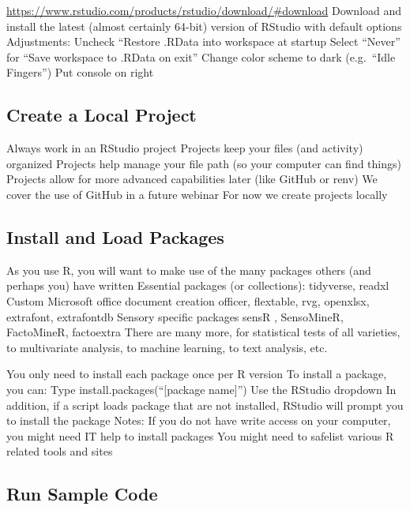 \documentclass[
]{book}
\begin{document}
\url{https://www.rstudio.com/products/rstudio/download/\#download}
Download and install the latest (almost certainly 64-bit) version of RStudio with default options
Adjustments:
Uncheck ``Restore .RData into workspace at startup
Select ``Never'' for ``Save workspace to .RData on exit''
Change color scheme to dark (e.g.~``Idle Fingers'')
Put console on right

\hypertarget{create-a-local-project}{%
\subsection{Create a Local Project}\label{create-a-local-project}}

Always work in an RStudio project
Projects keep your files (and activity) organized
Projects help manage your file path (so your computer can find things)
Projects allow for more advanced capabilities later (like GitHub or renv)
We cover the use of GitHub in a future webinar
For now we create projects locally

\hypertarget{install-and-load-packages}{%
\subsection{Install and Load Packages}\label{install-and-load-packages}}

As you use R, you will want to make use of the many packages others (and perhaps you) have written
Essential packages (or collections):
tidyverse, readxl
Custom Microsoft office document creation
officer, flextable, rvg, openxlsx, extrafont, extrafontdb
Sensory specific packages
sensR , SensoMineR, FactoMineR, factoextra
There are many more, for statistical tests of all varieties, to multivariate analysis, to machine learning, to text analysis, etc.

You only need to install each package once per R version
To install a package, you can:
Type install.packages(``{[}package name{]}'')
Use the RStudio dropdown
In addition, if a script loads package that are not installed, RStudio will prompt you to install the package
Notes:
If you do not have write access on your computer, you might need IT help to install packages
You might need to safelist various R related tools and sites

\hypertarget{run-sample-code}{%
\subsection{Run Sample Code}\label{run-sample-code}}
\end{document}
